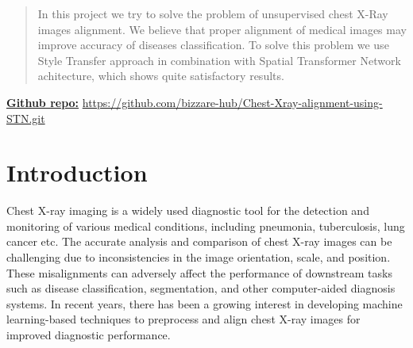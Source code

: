 \documentclass{article}
\begin{document}
\printAffiliationsAndNotice{}  %
\begin{abstract}

In this project we try to solve the problem of unsupervised chest X-Ray images
 alignment. We believe that proper alignment of medical images may improve accuracy
 of diseases classification. To solve this problem we use Style Transfer approach
 in combination with Spatial Transformer Network achitecture, which shows quite
 satisfactory results.

\end{abstract}

\underline{\textbf{Github repo:}} \href{https://github.com/bizzare-hub/Chest-Xray-alignment-using-STN.git}{https://github.com/bizzare-hub/Chest-Xray-alignment-using-STN.git}\newline

\section{Introduction}\label{introduction}

Chest X-ray imaging is a widely used diagnostic tool for the detection and 
 monitoring of various medical conditions, including pneumonia, tuberculosis, 
 lung cancer etc. The accurate analysis and comparison of chest X-ray images 
 can be challenging due to inconsistencies in the image orientation, scale, 
 and position. These misalignments can adversely affect the performance of 
 downstream tasks such as disease classification, segmentation, and other 
 computer-aided diagnosis systems. In recent years, there has been a growing 
 interest in developing machine learning-based techniques to preprocess and 
 align chest X-ray images for improved diagnostic performance.
\end{document}
